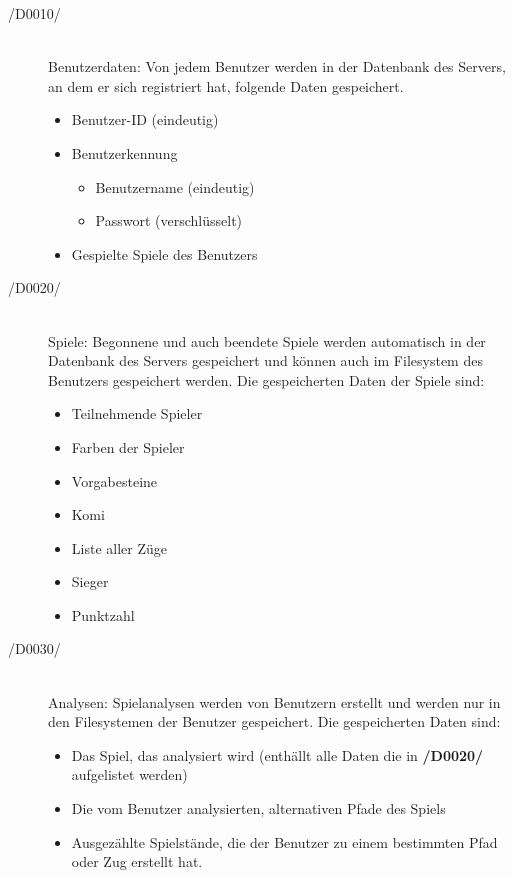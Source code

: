\begin{description}
	\item[/D0010/]~\\
		Benutzerdaten: Von jedem Benutzer werden in der Datenbank des Servers, an dem er sich registriert hat, folgende Daten gespeichert.
		\begin{itemize}
			\item Benutzer-ID (eindeutig)
			\item Benutzerkennung
			\begin{itemize}
				\item Benutzername (eindeutig)
				\item Passwort (verschlüsselt)
			\end{itemize}
			\item Gespielte Spiele des Benutzers
		\end{itemize}
	\item[/D0020/]~\\
		Spiele: Begonnene und auch beendete Spiele werden automatisch in der Datenbank des Servers gespeichert und können auch im Filesystem des Benutzers gespeichert werden. Die gespeicherten Daten der Spiele sind:
		\begin{itemize}
			\item Teilnehmende Spieler
			\item Farben der Spieler
			\item Vorgabesteine
			\item Komi
			\item Liste aller Züge
			\item Sieger
			\item Punktzahl
		\end{itemize}
	\item[/D0030/]~\\
		Analysen: Spielanalysen werden von Benutzern erstellt und werden nur in den Filesystemen der Benutzer gespeichert. Die gespeicherten Daten sind:
		\begin{itemize}
			\item Das Spiel, das analysiert wird (enthällt alle Daten die in \textbf{/D0020/} aufgelistet werden)
			\item Die vom Benutzer analysierten, alternativen Pfade des Spiels
			\item Ausgezählte Spielstände, die der Benutzer zu einem bestimmten Pfad oder Zug erstellt hat.
		\end{itemize}
\end{description}



